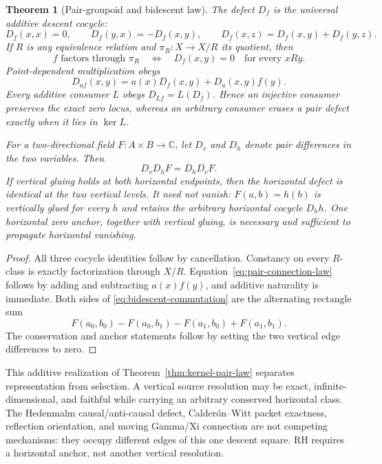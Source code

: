 \documentclass[11pt]{article}
\newtheorem{theorem}{Theorem}[section]
\theoremstyle{definition}
\theoremstyle{remark}
\newcommand{\C}{\mathbb C}
\begin{document}
\begin{theorem}[Pair-groupoid and bidescent law]
\label{thm:pair-groupoid-bidescent}
The defect \(D_f\) is the universal additive descent cocycle:
\[
 D_f(x,x)=0,\qquad D_f(y,x)=-D_f(x,y),\qquad
 D_f(x,z)=D_f(x,y)+D_f(y,z).
\tag{4.16H}\label{eq:pair-cocycle-law}
\]
If \(R\) is any equivalence relation and
\(\pi_R:X\to X/R\) its quotient, then
\[
       f\text{ factors through }\pi_R
       \quad\Longleftrightarrow\quad
       D_f(x,y)=0\quad\text{for every }xRy.
\tag{4.16I}\label{eq:pair-quotient-complete}
\]
Point-dependent multiplication obeys
\[
 \boxed{\quad
 D_{af}(x,y)=a(x)D_f(x,y)+D_a(x,y)f(y).
 \quad}
\tag{4.16J}\label{eq:pair-connection-law}
\]
Every additive consumer \(L\) obeys \(D_{Lf}=L(D_f)\).  Hence an injective
consumer preserves the exact zero locus, whereas an arbitrary consumer
erases a pair defect exactly when it lies in \(\ker L\).

For a two-directional field \(F:A\times B\to\C\), let \(D_v\) and \(D_h\)
denote pair differences in the two variables.  Then
\[
                         D_vD_hF=D_hD_vF.
\tag{4.16K}\label{eq:bidescent-commutation}
\]
If vertical gluing holds at both horizontal endpoints, then the horizontal
defect is identical at the two vertical levels.  It need not vanish:
\(F(a,b)=h(b)\) is vertically glued for every \(h\) and retains the
arbitrary horizontal cocycle \(D_hh\).  One horizontal zero anchor, together
with vertical gluing, is necessary and sufficient to propagate horizontal
vanishing.
\end{theorem}

\begin{proof}
All three cocycle identities follow by cancellation.  Constancy on every
\(R\)-class is exactly factorization through \(X/R\).
Equation~\eqref{eq:pair-connection-law} follows by adding and subtracting
\(a(x)f(y)\), and additive naturality is immediate.  Both sides of
\eqref{eq:bidescent-commutation} are the alternating rectangle sum
\[
 F(a_0,b_0)-F(a_0,b_1)-F(a_1,b_0)+F(a_1,b_1).
\]
The conservation and anchor statements follow by setting the two vertical
edge differences to zero.
\end{proof}

This additive realization of Theorem~\ref{thm:kernel-pair-law} separates
representation from selection.  A vertical source
resolution may be exact, infinite-dimensional, and faithful while carrying
an arbitrary conserved horizontal class.  The Hedenmalm causal/anti-causal
defect, Calder\'on--Witt packet exactness, reflection orientation, and
moving Gamma/Xi connection are not competing mechanisms: they occupy
different edges of this one descent square.  RH requires a horizontal
anchor, not another vertical resolution.
\end{document}
